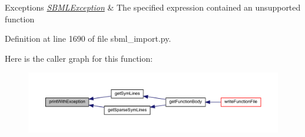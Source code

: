 \begin{DoxyExceptions}{Exceptions}
{\em \mbox{\hyperlink{classamici_1_1sbml__import_1_1_s_b_m_l_exception}{S\+B\+M\+L\+Exception}}} & The specified expression contained an unsupported function \\
\hline
\end{DoxyExceptions}


Definition at line 1690 of file sbml\+\_\+import.\+py.

Here is the caller graph for this function\+:
\nopagebreak
\begin{figure}[H]
\begin{center}
\leavevmode
\includegraphics[width=350pt]{classamici_1_1sbml__import_1_1_sbml_importer_a8628c4bc7d378583201bf3681bcd0559_icgraph}
\end{center}
\end{figure}

